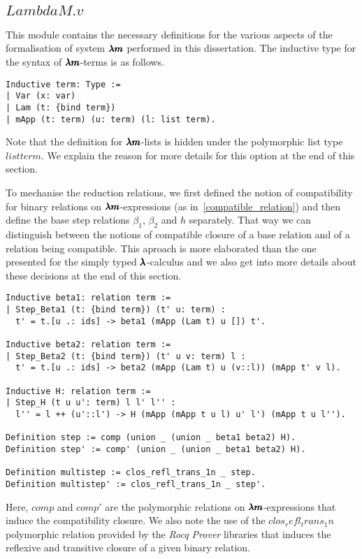\subsection{\lst$LambdaM.v$}

This module contains the necessary definitions for the various aspects of the formalisation of system $\pmb{\lambda m}$ performed in this dissertation.
The inductive type for the syntax of $\pmb{\lambda m}$-terms is as follows.
\begin{lstlisting}[language=Coq]
Inductive term: Type :=
| Var (x: var)
| Lam (t: {bind term})
| mApp (t: term) (u: term) (l: list term).
\end{lstlisting}
Note that the definition for $\pmb{\lambda m}$-lists is hidden under the polymorphic list type \lst$list term$.
We explain the reason for more details for this option at the end of this section.

To mechanise the reduction relations, we first defined the notion of compatibility for binary relations on $\pmb{\lambda m}$-expressions (as in~\cref{compatible_relation}) and then define the base step relations $\beta_1$, $\beta_2$ and $h$ separately.
That way we can distinguish between the notions of compatible closure of a base relation and of a relation being compatible.
This aproach is more elaborated than the one presented for the simply typed $\pmb{\lambda}$-calculus and we also get into more details about these decisions at the end of this section.

\begin{lstlisting}[language=Coq]
Inductive beta1: relation term :=
| Step_Beta1 (t: {bind term}) (t' u: term) :
  t' = t.[u .: ids] -> beta1 (mApp (Lam t) u []) t'.

Inductive beta2: relation term :=
| Step_Beta2 (t: {bind term}) (t' u v: term) l :
  t' = t.[u .: ids] -> beta2 (mApp (Lam t) u (v::l)) (mApp t' v l).

Inductive H: relation term :=       
| Step_H (t u u': term) l l' l'' :
  l'' = l ++ (u'::l') -> H (mApp (mApp t u l) u' l') (mApp t u l'').

Definition step := comp (union _ (union _ beta1 beta2) H).
Definition step' := comp' (union _ (union _ beta1 beta2) H).

Definition multistep := clos_refl_trans_1n _ step.
Definition multistep' := clos_refl_trans_1n _ step'.
\end{lstlisting}

Here, \lst$comp$ and \lst$comp'$ are the polymorphic relations on $\pmb{\lambda m}$-expressions that induce the compatibility closure.
We also note the use of the \lst$clos_refl_trans_1n$ polymorphic relation provided by the \textit{Rocq Prover} libraries that induces the reflexive and transitive closure of a given binary relation.

